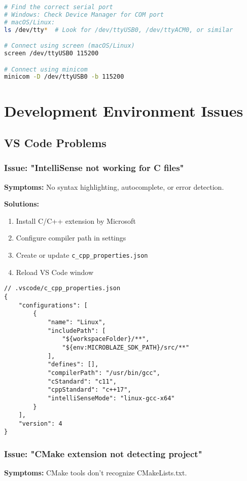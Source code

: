 \documentclass[11pt,a4paper]{article}
\begin{document}
\begin{lstlisting}[language=bash]
# Find the correct serial port
# Windows: Check Device Manager for COM port
# macOS/Linux:
ls /dev/tty*  # Look for /dev/ttyUSB0, /dev/ttyACM0, or similar

# Connect using screen (macOS/Linux)
screen /dev/ttyUSB0 115200

# Connect using minicom
minicom -D /dev/ttyUSB0 -b 115200
\end{lstlisting}

\section{Development Environment Issues}

\subsection{VS Code Problems}

\subsubsection{Issue: "IntelliSense not working for C files"}
\textbf{Symptoms:} No syntax highlighting, autocomplete, or error detection.

\textbf{Solutions:}
\begin{enumerate}
    \item Install C/C++ extension by Microsoft
    \item Configure compiler path in settings
    \item Create or update \texttt{c\_cpp\_properties.json}
    \item Reload VS Code window
\end{enumerate}

\begin{lstlisting}
// .vscode/c_cpp_properties.json
{
    "configurations": [
        {
            "name": "Linux",
            "includePath": [
                "${workspaceFolder}/**",
                "${env:MICROBLAZE_SDK_PATH}/src/**"
            ],
            "defines": [],
            "compilerPath": "/usr/bin/gcc",
            "cStandard": "c11",
            "cppStandard": "c++17",
            "intelliSenseMode": "linux-gcc-x64"
        }
    ],
    "version": 4
}
\end{lstlisting}

\subsubsection{Issue: "CMake extension not detecting project"}
\textbf{Symptoms:} CMake tools don't recognize CMakeLists.txt.
\end{document}
